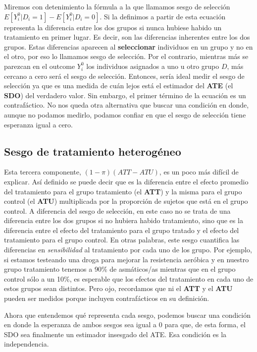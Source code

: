 \documentclass[
  letterpaper,
  DIV=11,
  numbers=noendperiod,
  oneside]{scrreprt}
\begin{document}
Miremos con detenimiento la fórmula a la que llamamos sesgo de selección
\(E[Y_i^0|D_i=1] - E[Y_i^0|D_i=0]\). Si la definimos a partir de esta
ecuación representa la diferencia entre los dos grupos si nunca hubiese
habido un tratamiento en primer lugar. Es decir, son las diferencias
inherentes entre los dos grupos. Estas diferencias aparecen al
\textbf{seleccionar} individuos en un grupo y no en el otro, por eso lo
llamamos sesgo de selección. Por el contrario, mientras más se parezcan
en el outcome \(Y_i^0\) los individuos asignados a uno u otro grupo
\(D\), más cercano a cero será el sesgo de selección. Entonces, sería
ideal medir el sesgo de selección ya que es una medida de cuán lejos
está el estimador del \textbf{ATE} (el \textbf{SDO}) del verdadero
valor. Sin embargo, el primer término de la ecuación es un
contrafáctico. No nos queda otra alternativa que buscar una condición en
donde, aunque no podamos medirlo, podamos confiar en que el sesgo de
selección tiene esperanza igual a cero.

\hypertarget{sesgo-de-tratamiento-heteroguxe9neo}{%
\subsection{Sesgo de tratamiento
heterogéneo}\label{sesgo-de-tratamiento-heteroguxe9neo}}

Esta tercera componente, \((1-\pi) (ATT - ATU)\), es un poco más difícil
de explicar. Así definido se puede decir que es la diferencia entre el
efecto promedio del tratamiento para el grupo tratamiento (el
\textbf{ATT}) y la misma para el grupo control (el \textbf{ATU})
multiplicada por la proporción de sujetos que está en el grupo control.
A diferencia del sesgo de selección, en este caso no se trata de una
diferencia entre los dos grupos si no hubiera habido tratamiento, sino
que es la diferencia entre el efecto del tratamiento para el grupo
tratado y el efecto del tratamiento para el grupo control. En otras
palabras, este sesgo cuantifica las diferencias en \emph{sensibilidad}
al tratamiento por cada uno de los grupo. Por ejemplo, si estamos
testeando una droga para mejorar la resistencia aeróbica y en nuestro
grupo tratamiento tenemos a 90\% de asmáticos/as mientras que en el
grupo control sólo a un 10\%, es esperable que los efectos del
tratamiento en cada uno de estos grupos sean distintos. Pero ojo,
recordamos que ni el \textbf{ATT} y el \textbf{ATU} pueden ser medidos
porque incluyen contrafácticos en su definición.

Ahora que entendemos qué representa cada sesgo, podemos buscar una
condición en donde la esperanza de ambos sesgos sea igual a 0 para que,
de esta forma, el SDO sea finalmente un estimador insesgado del ATE. Esa
condición es la independencia.
\end{document}
